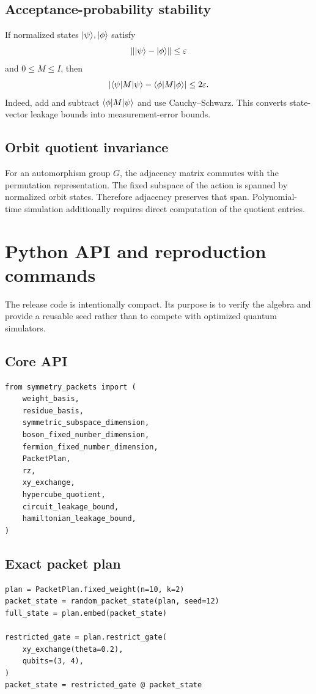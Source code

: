 \subsection{Acceptance-probability stability}
If normalized states $\lvert \psi\rangle,\lvert \phi\rangle$ satisfy
\[
\|\lvert \psi\rangle-\lvert \phi\rangle\|\le\varepsilon
\]
and $0\le M\le I$, then
\[
|\langle \psi\rvert M\lvert \psi\rangle-\langle \phi\rvert M\lvert \phi\rangle|
\le 2\varepsilon.
\]
Indeed, add and subtract $\langle \phi\rvert M\lvert \psi\rangle$ and use Cauchy--Schwarz. This converts state-vector leakage bounds into measurement-error bounds.

\subsection{Orbit quotient invariance}
For an automorphism group $G$, the adjacency matrix commutes with the permutation representation. The fixed subspace of the action is spanned by normalized orbit states. Therefore adjacency preserves that span. Polynomial-time simulation additionally requires direct computation of the quotient entries.

\section{Python API and reproduction commands}
\label{s:app:python}

The release code is intentionally compact. Its purpose is to verify the algebra and provide a reusable seed rather than to compete with optimized quantum simulators.

\subsection{Core API}
\begin{lstlisting}[style=pythonstyle,caption={Core packet API.}]
from symmetry_packets import (
    weight_basis,
    residue_basis,
    symmetric_subspace_dimension,
    boson_fixed_number_dimension,
    fermion_fixed_number_dimension,
    PacketPlan,
    rz,
    xy_exchange,
    hypercube_quotient,
    circuit_leakage_bound,
    hamiltonian_leakage_bound,
)
\end{lstlisting}

\subsection{Exact packet plan}
\begin{lstlisting}[style=pythonstyle,caption={Fixed-weight packet compilation.}]
plan = PacketPlan.fixed_weight(n=10, k=2)
packet_state = random_packet_state(plan, seed=12)
full_state = plan.embed(packet_state)

restricted_gate = plan.restrict_gate(
    xy_exchange(theta=0.2),
    qubits=(3, 4),
)
packet_state = restricted_gate @ packet_state
\end{lstlisting}


